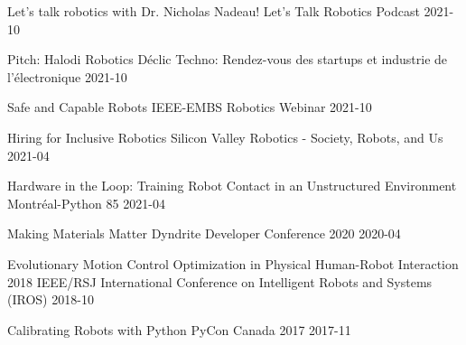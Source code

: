 \begin{cvhonors}

\cvhonor
{Let's talk robotics with Dr. Nicholas Nadeau!}
{Let’s Talk Robotics Podcast}
{}
{2021-10}

\cvhonor
{Pitch: Halodi Robotics}
{Déclic Techno: Rendez-vous des startups et industrie de l'électronique}
{}
{2021-10}

\cvhonor
{Safe and Capable Robots}
{IEEE-EMBS Robotics Webinar}
{}
{2021-10}

\cvhonor
{Hiring for Inclusive Robotics}
{Silicon Valley Robotics - Society, Robots, and Us}
{}
{2021-04}

\cvhonor
{Hardware in the Loop: Training Robot Contact in an Unstructured Environment}
{Montréal-Python 85}
{}
{2021-04}

\cvhonor
{Making Materials Matter}
{Dyndrite Developer Conference 2020}
{}
{2020-04}

\cvhonor
{Evolutionary Motion Control Optimization in Physical Human-Robot Interaction}
{2018 IEEE/RSJ International Conference on Intelligent Robots and Systems (IROS)}
{}
{2018-10}

\cvhonor
{Calibrating Robots with Python}
{PyCon Canada 2017}
{}
{2017-11}

\end{cvhonors}

